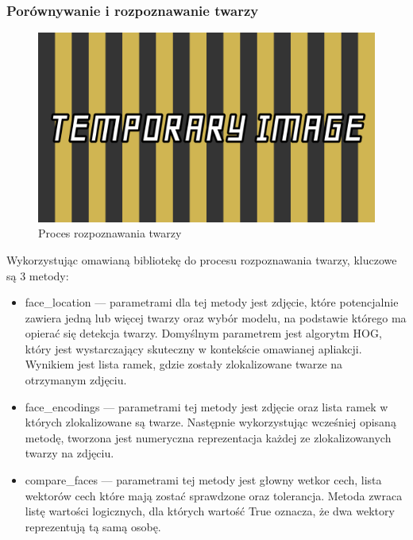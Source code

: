 \subsubsection{Porównywanie i rozpoznawanie twarzy}
\begin{figure}[h]
	\centering
		\includegraphics[width=0.6\linewidth]{imgs/temp.png}
	\caption{Proces rozpoznawania twarzy}
	\label{fig:proces-rozpoznawania}
\end{figure}
Wykorzystując omawianą bibliotekę do procesu rozpoznawania twarzy, kluczowe są 3 metody:
\begin{itemize}
  \item {\selectfont face\_location } --- parametrami dla tej metody jest zdjęcie, które potencjalnie zawiera jedną lub więcej twarzy oraz wybór modelu, na podstawie którego ma opierać się detekcja twarzy. Domyślnym parametrem jest algorytm HOG, który jest wystarczający skuteczny w kontekście omawianej apliakcji. Wynikiem jest lista ramek, gdzie zostały zlokalizowane twarze na otrzymanym zdjęciu.
  \item {\selectfont face\_encodings } --- parametrami tej metody jest zdjęcie oraz lista ramek w których zlokalizowane są twarze. Następnie wykorzystując wcześniej opisaną metodę, tworzona jest numeryczna reprezentacja każdej ze zlokalizowanych twarzy na zdjęciu.
  \item {\selectfont compare\_faces } --- parametrami tej metody jest głowny wetkor cech, lista wektorów cech które mają zostać sprawdzone oraz tolerancja. Metoda zwraca listę wartości logicznych, dla których wartość True oznacza, że dwa wektory reprezentują tą samą osobę.

\end{itemize}

